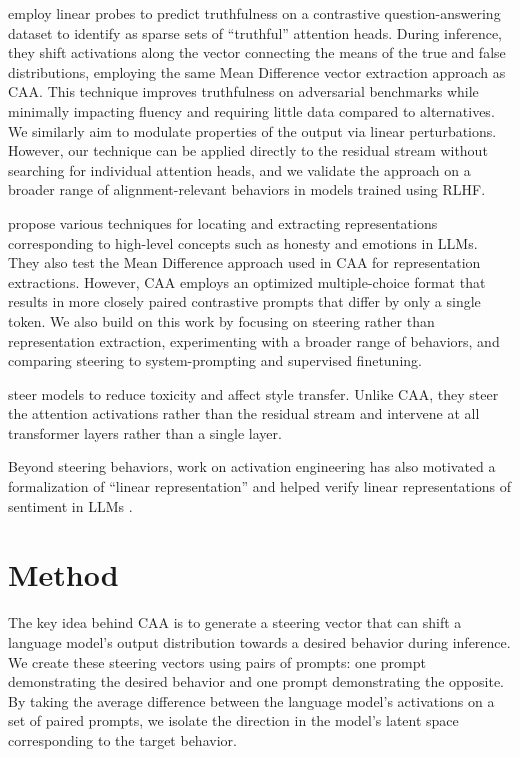 \documentclass[11pt]{article}
\begin{document}
\citet{li2023inferencetime} employ linear probes to predict truthfulness on a contrastive question-answering dataset to identify as sparse sets of ``truthful'' attention heads. During inference, they shift activations along the vector connecting the means of the true and false distributions, employing the same Mean Difference vector extraction approach as CAA. This technique improves truthfulness on adversarial benchmarks while minimally impacting fluency and requiring little data compared to alternatives. We similarly aim to modulate properties of the output via linear perturbations. However, our technique can be applied directly to the residual stream without searching for individual attention heads, and we validate the approach on a broader range of alignment-relevant behaviors in models trained using RLHF.

\citet{zou2023representation} propose various techniques for locating and extracting representations corresponding to high-level concepts such as honesty and emotions in LLMs. They also test the Mean Difference approach used in CAA for representation extractions. However, CAA employs an optimized multiple-choice format that results in more closely paired contrastive prompts that differ by only a single token. We also build on this work by focusing on steering rather than representation extraction, experimenting with a broader range of behaviors, and comparing steering to system-prompting and supervised finetuning.

\citet{liu2023incontext} steer models to reduce toxicity and affect style transfer. Unlike CAA, they steer the attention activations rather than the residual stream and intervene at all transformer layers rather than a single layer. 

Beyond steering behaviors, work on activation engineering has also motivated a formalization of ``linear representation'' \citep{park2023linear} and helped verify linear representations of sentiment in LLMs \citep{tigges2023linear}.

\section{Method}\label{sec:method}

The key idea behind CAA is to generate a steering vector that can shift a language model's output distribution towards a desired behavior during inference. We create these steering vectors using pairs of prompts: one prompt demonstrating the desired behavior and one prompt demonstrating the opposite. By taking the average difference between the language model's activations on a set of paired prompts, we isolate the direction in the model's latent space corresponding to the target behavior.
\end{document}
